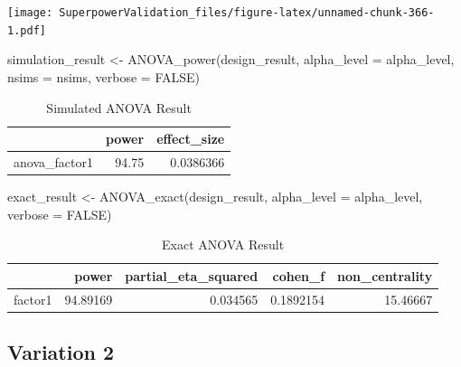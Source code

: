 \documentclass[
]{book}
\newenvironment{Shaded}{\begin{snugshade}}{\end{snugshade}}
\newcommand{\AttributeTok}[1]{\textcolor[rgb]{0.77,0.63,0.00}{#1}}
\newcommand{\ConstantTok}[1]{\textcolor[rgb]{0.00,0.00,0.00}{#1}}
\newcommand{\FunctionTok}[1]{\textcolor[rgb]{0.00,0.00,0.00}{#1}}
\newcommand{\NormalTok}[1]{#1}
\newcommand{\OtherTok}[1]{\textcolor[rgb]{0.56,0.35,0.01}{#1}}
\begin{document}
\texttt{[image: SuperpowerValidation\_files/figure-latex/unnamed-chunk-366-1.pdf]}

\begin{Shaded}
\begin{Highlighting}[]
\NormalTok{simulation\_result }\OtherTok{\textless{}{-}} \FunctionTok{ANOVA\_power}\NormalTok{(design\_result, }
                                 \AttributeTok{alpha\_level =}\NormalTok{ alpha\_level, }
                                 \AttributeTok{nsims =}\NormalTok{ nsims,}
                                 \AttributeTok{verbose =} \ConstantTok{FALSE}\NormalTok{)}
\end{Highlighting}
\end{Shaded}

\begin{table}[!h]

\caption{\label{tab:unnamed-chunk-368}Simulated ANOVA Result}
\centering
\begin{tabular}[t]{l|r|r}
\hline
  & power & effect\_size\\
\hline
anova\_factor1 & 94.75 & 0.0386366\\
\hline
\end{tabular}
\end{table}

\begin{Shaded}
\begin{Highlighting}[]
\NormalTok{exact\_result }\OtherTok{\textless{}{-}} \FunctionTok{ANOVA\_exact}\NormalTok{(design\_result,}
                            \AttributeTok{alpha\_level =}\NormalTok{ alpha\_level,}
                            \AttributeTok{verbose =} \ConstantTok{FALSE}\NormalTok{)}
\end{Highlighting}
\end{Shaded}

\begin{table}[!h]

\caption{\label{tab:unnamed-chunk-370}Exact ANOVA Result}
\centering
\begin{tabular}[t]{l|r|r|r|r}
\hline
  & power & partial\_eta\_squared & cohen\_f & non\_centrality\\
\hline
factor1 & 94.89169 & 0.034565 & 0.1892154 & 15.46667\\
\hline
\end{tabular}
\end{table}

\hypertarget{variation-2}{%
\subsection{Variation 2}\label{variation-2}}
\end{document}
